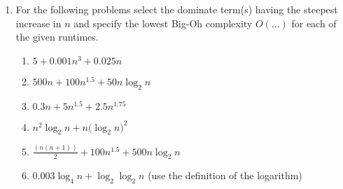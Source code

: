\documentclass[12pt]{article}
\begin{document}
\begin{enumerate}
\newpage
\item For the following problems select the dominate term(s) having the 
steepest increase in $n$ and specify the lowest Big-Oh complexity $O(\dots)$
for each of the given runtimes.
\begin{enumerate}
\item $5+0.001n^3+0.025n$
\item $500n+100n^{1.5}+50n\log_2{n}$
\item $0.3n+5n^{1.5}+2.5n^{1.75}$
\item $n^2\log_2{n}+n(\log_2{n)^2}$
\item $\frac{(n(n+1))}{2} + 100n^{1.5} + 500n\log_2{n}$
\item $0.003\log_4{n}+\log_2{\log_2{n}}$ (use the definition of the logarithm)
\end{enumerate}
\end{enumerate}
\end{document}
